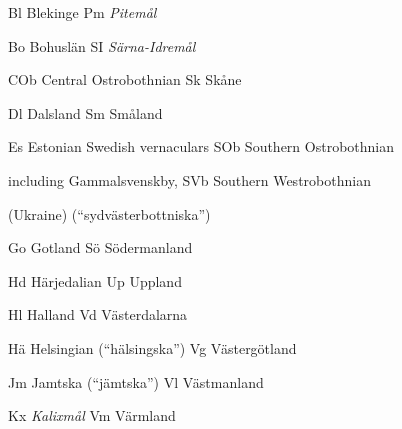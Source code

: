 Bl  Blekinge  Pm  \textit{Pitemål}


Bo  Bohuslän  SI  \textit{Särna-Idremål}


COb  Central Ostrobothnian  Sk  Skåne


Dl  Dalsland  Sm  Småland


Es  Estonian Swedish vernaculars   SOb  Southern Ostrobothnian


  including Gammalsvenskby,  SVb  Southern Westrobothnian


  (Ukraine)    (“sydvästerbottniska”)


Go  Gotland  Sö  Södermanland


Hd  Härjedalian  Up  Uppland


Hl  Halland  Vd  Västerdalarna


Hä  Helsingian (“hälsingska”)  Vg  Västergötland


Jm  Jamtska (“jämtska”)  Vl  Västmanland


Kx  \textit{Kalixmål}  Vm  Värmland


